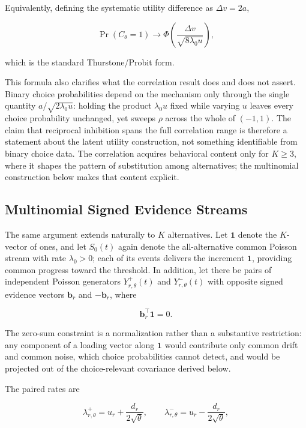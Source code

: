 \documentclass[
  man,
  floatsintext,
  longtable,
  a4paper,
  nolmodern,
  notxfonts,
  notimes,
  colorlinks=true,linkcolor=blue,citecolor=blue,urlcolor=blue]{apa7}
\begin{document}
Equivalently, defining the systematic utility difference as
\(\Delta v=2a\),

\[
\Pr(C_\theta=1)
\longrightarrow
\Phi
\left(
\frac{\Delta v}{\sqrt{8\lambda_0 u}}
\right),
\]

which is the standard Thurstone/Probit form.

This formula also clarifies what the correlation result does and does
not assert. Binary choice probabilities depend on the mechanism only
through the single quantity \(a/\sqrt{2\lambda_0 u}\): holding the
product \(\lambda_0 u\) fixed while varying \(u\) leaves every choice
probability unchanged, yet sweeps \(\rho\) across the whole of
\((-1,1)\). The claim that reciprocal inhibition spans the full
correlation range is therefore a statement about the latent utility
construction, not something identifiable from binary choice data. The
correlation acquires behavioral content only for \(K\geq 3\), where it
shapes the pattern of substitution among alternatives; the multinomial
construction below makes that content explicit.

\subsection{Multinomial Signed Evidence
Streams}\label{multinomial-signed-evidence-streams}

The same argument extends naturally to \(K\) alternatives. Let
\(\mathbf 1\) denote the \(K\)-vector of ones, and let \(S_0(t)\) again
denote the all-alternative common Poisson stream with rate
\(\lambda_0>0\); each of its events delivers the increment
\(\mathbf 1\), providing common progress toward the threshold. In
addition, let there be pairs of independent Poisson generators
\(Y_{r,\theta}^{+}(t)\) and \(Y_{r,\theta}^{-}(t)\) with opposite signed
evidence vectors \(\mathbf b_r\) and \(-\mathbf b_r\), where

\[
\mathbf b_r^\top\mathbf 1=0.
\]

The zero-sum constraint is a normalization rather than a substantive
restriction: any component of a loading vector along \(\mathbf 1\) would
contribute only common drift and common noise, which choice
probabilities cannot detect, and would be projected out of the
choice-relevant covariance derived below.

The paired rates are

\[
\lambda_{r,\theta}^{+}
=
u_r+\frac{d_r}{2\sqrt{\theta}},
\qquad
\lambda_{r,\theta}^{-}
=
u_r-\frac{d_r}{2\sqrt{\theta}},
\]
\end{document}
